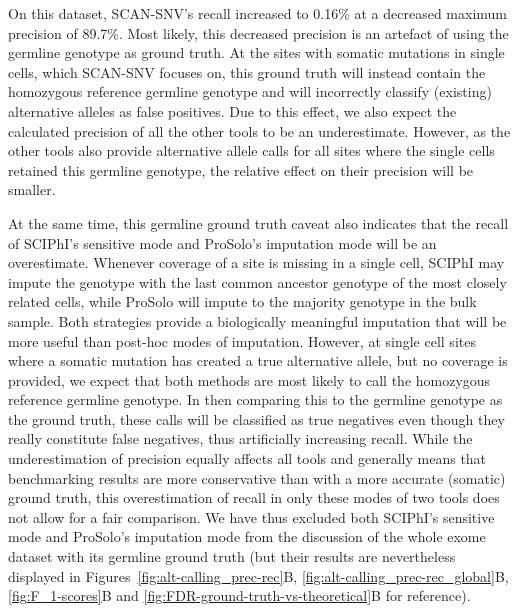 \documentclass[fleqn,12pt,inline]{wlscirep}
\begin{document}
On this dataset, SCAN-SNV's recall increased to 0.16\% at a decreased maximum precision of 89.7\%.
Most likely, this decreased precision is an artefact of using the germline genotype as ground truth.
At the sites with somatic mutations in single cells, which SCAN-SNV focuses on, this ground truth will instead contain the homozygous reference germline genotype and will incorrectly classify (existing) alternative alleles as false positives.
Due to this effect, we also expect the calculated precision of all the other tools to be an underestimate.
However, as the other tools also provide alternative allele calls for all sites where the single cells retained this germline genotype, the relative effect on their precision will be smaller.

At the same time, this germline ground truth caveat also indicates that the recall of SCIPhI's sensitive mode and ProSolo's imputation mode will be an overestimate.
Whenever coverage of a site is missing in a single cell, SCIPhI may impute the genotype with the last common ancestor genotype of the most closely related cells, while ProSolo will impute to the majority genotype in the bulk sample.
Both strategies provide a biologically meaningful imputation that will be more useful than post-hoc modes of imputation.
However, at single cell sites where a somatic mutation has created a true alternative allele, but no coverage is provided, we expect that both methods are most likely to call the homozygous reference germline genotype.
In then comparing this to the germline genotype as the ground truth, these calls will be classified as true negatives even though they really constitute false negatives, thus artificially increasing recall.
While the underestimation of precision equally affects all tools and generally means that benchmarking results are more conservative than with a more accurate (somatic) ground truth, this overestimation of recall in only these modes of two tools does not allow for a fair comparison.
We have thus excluded both SCIPhI's sensitive mode and ProSolo's imputation mode from the discussion of the whole exome dataset with its germline ground truth (but their results are nevertheless displayed in Figures~\ref{fig:alt-calling_prec-rec}B, \ref{fig:alt-calling_prec-rec_global}B, \ref{fig:F_1-scores}B and \ref{fig:FDR-ground-truth-vs-theoretical}B for reference).
\end{document}
